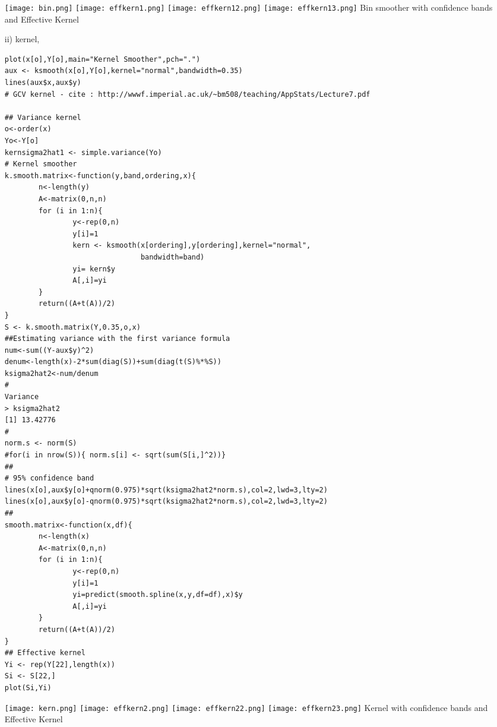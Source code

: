 \documentclass[11pt]{report}
\begin{document}
\begin{itemize}
\texttt{[image: bin.png]}
\texttt{[image: effkern1.png]}
\texttt{[image: effkern12.png]}
\texttt{[image: effkern13.png]}
Bin smoother with confidence bands and Effective Kernel

\item[ii) ] kernel,
\begin{verbatim}
plot(x[o],Y[o],main="Kernel Smoother",pch=".")
aux <- ksmooth(x[o],Y[o],kernel="normal",bandwidth=0.35)
lines(aux$x,aux$y)
# GCV kernel - cite : http://wwwf.imperial.ac.uk/~bm508/teaching/AppStats/Lecture7.pdf

## Variance kernel
o<-order(x)
Yo<-Y[o]
kernsigma2hat1 <- simple.variance(Yo)
# Kernel smoother
k.smooth.matrix<-function(y,band,ordering,x){
        n<-length(y)
        A<-matrix(0,n,n)
        for (i in 1:n){
                y<-rep(0,n)
                y[i]=1
                kern <- ksmooth(x[ordering],y[ordering],kernel="normal",
                                bandwidth=band)
                yi= kern$y
                A[,i]=yi
        }
        return((A+t(A))/2)
}
S <- k.smooth.matrix(Y,0.35,o,x)
##Estimating variance with the first variance formula
num<-sum((Y-aux$y)^2)
denum<-length(x)-2*sum(diag(S))+sum(diag(t(S)%*%S))
ksigma2hat2<-num/denum
#
Variance
> ksigma2hat2
[1] 13.42776
#
norm.s <- norm(S)
#for(i in nrow(S)){ norm.s[i] <- sqrt(sum(S[i,]^2))}
##
# 95% confidence band
lines(x[o],aux$y[o]+qnorm(0.975)*sqrt(ksigma2hat2*norm.s),col=2,lwd=3,lty=2)
lines(x[o],aux$y[o]-qnorm(0.975)*sqrt(ksigma2hat2*norm.s),col=2,lwd=3,lty=2)
##
smooth.matrix<-function(x,df){
        n<-length(x)
        A<-matrix(0,n,n)
        for (i in 1:n){
                y<-rep(0,n)
                y[i]=1
                yi=predict(smooth.spline(x,y,df=df),x)$y
                A[,i]=yi
        }
        return((A+t(A))/2)
}
## Effective kernel
Yi <- rep(Y[22],length(x))
Si <- S[22,]
plot(Si,Yi)
\end{verbatim}

\texttt{[image: kern.png]}
\texttt{[image: effkern2.png]}
\texttt{[image: effkern22.png]}
\texttt{[image: effkern23.png]}
Kernel with confidence bands and Effective Kernel




\end{itemize}
\end{document}
